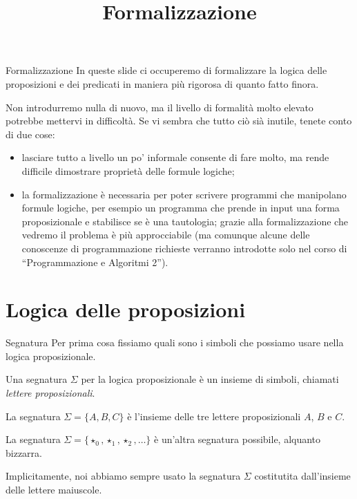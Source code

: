 \documentclass[aspectratio=169,10pt,dvipsnames,xcolor=table,handout]{beamer}
\title[]{Formalizzazione}
\begin{document}
\begin{frame}
    \titlepage
\end{frame}

\begin{frame}{Formalizzazione}
    In queste slide ci occuperemo di formalizzare la logica delle proposizioni e dei predicati in maniera più rigorosa di quanto fatto finora.

    \medskip Non introdurremo nulla di nuovo, ma il livello di formalità molto elevato potrebbe mettervi in difficoltà. Se vi sembra che tutto ciò sià inutile, tenete conto di due cose:
    \begin{itemize}
        \item lasciare tutto a livello un po' informale consente di fare molto, ma rende difficile dimostrare proprietà delle formule logiche;
        \item la formalizzazione è necessaria per poter scrivere programmi che manipolano formule logiche, per esempio un programma che prende in input una forma proposizionale e stabilisce se è una tautologia; grazie alla formalizzazione che vedremo il problema è più approcciabile (ma comunque alcune delle conoscenze di programmazione richieste verranno introdotte solo nel corso di ``Programmazione e Algoritmi 2'').
    \end{itemize}
\end{frame}

\section{Logica delle proposizioni}

\begin{frame}{Segnatura}
    Per prima cosa fissiamo quali sono i simboli che possiamo usare nella logica proposizionale.
    \pause

    \begin{definition}[Segnatura]
        Una \alert{segnatura} $\Sigma$ per la logica proposizionale è un insieme di simboli, chiamati \emph{lettere proposizionali}.
    \end{definition}

    \pause
    \begin{example}
        La segnatura $\Sigma = \{A, B, C\}$ è l'insieme delle tre lettere proposizionali $A$, $B$ e $C$.
    \end{example}

    \pause
    \begin{example}
        La segnatura $\Sigma = \{\star_0, \star_1, \star_2, \ldots \}$ è un'altra segnatura possibile, alquanto bizzarra.
    \end{example}

    \pause
    Implicitamente, noi abbiamo sempre usato la segnatura $\Sigma$ costitutita dall'insieme delle lettere maiuscole.
\end{frame}
\end{document}
